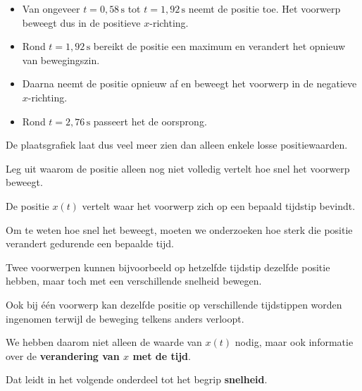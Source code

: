 \documentclass{ximera}
\begin{document}
\begin{oefening}{\oefU\ESS}
\begin{question}
\begin{oplossing}
\begin{itemize}
      \item Van ongeveer $t=0{,}58\,\mathrm{s}$ tot
      $t=1{,}92\,\mathrm{s}$ neemt de positie toe.
      Het voorwerp beweegt dus in de positieve $x$-richting.
  
      \item Rond $t=1{,}92\,\mathrm{s}$ bereikt de positie een maximum en
      verandert het opnieuw van bewegingszin.
  
      \item Daarna neemt de positie opnieuw af en beweegt het voorwerp in de
      negatieve $x$-richting.
  
      \item Rond $t=2{,}76\,\mathrm{s}$ passeert het de oorsprong.
  \end{itemize}
  
  De plaatsgrafiek laat dus veel meer zien dan alleen enkele losse
  positiewaarden.
  \end{oplossing}
  \end{question}
  
  
  \begin{question}
  Leg uit waarom de positie alleen nog niet volledig vertelt hoe snel het
  voorwerp beweegt.
  
  \begin{oplossing}
  De positie $x(t)$ vertelt waar het voorwerp zich op een bepaald tijdstip
  bevindt.
  
  Om te weten hoe snel het beweegt, moeten we onderzoeken hoe sterk die positie
  verandert gedurende een bepaalde tijd.
  
  Twee voorwerpen kunnen bijvoorbeeld op hetzelfde tijdstip dezelfde positie
  hebben, maar toch met een verschillende snelheid bewegen.
  
  Ook bij één voorwerp kan dezelfde positie op verschillende tijdstippen worden
  ingenomen terwijl de beweging telkens anders verloopt.
  
  We hebben daarom niet alleen de waarde van $x(t)$ nodig, maar ook informatie
  over de \textbf{verandering van $x$ met de tijd}.
  
  Dat leidt in het volgende onderdeel tot het begrip \textbf{snelheid}.
  \end{oplossing}
  \end{question}
  
  \end{oefening}
\end{document}

